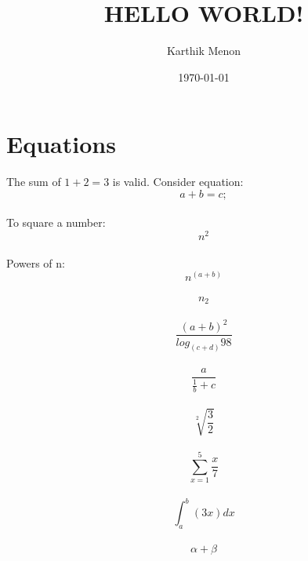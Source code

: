 \documentclass[a4paper,12pt]{article}
\begin{document}
\title{HELLO WORLD!}
\author{Karthik Menon}
\date{\today}
\maketitle
\newpage
\section{Equations}
		The sum of $1+2=3$ is valid.
		Consider equation: 
		\begin{equation}
			a+b=c;
		\end{equation}\\
		To square a number:
		\begin{equation}
			n^2
		\end{equation}\\
		Powers of n: 
		\begin{equation}
			n^{(a+b)}
		\end{equation}\\
		\begin{equation}
			n_{2}
		\end{equation}\\
		\begin{equation}
			 \frac{{(a+b)}^2}{log_{(c+d)}98} 
		\end{equation}\\
		\begin{equation}
			\frac{a}{\frac{1}{b}+c}
		\end{equation}\\
		\begin{equation}
			\sqrt[2]{\frac{3}{2}}
		\end{equation}\\
		\begin{equation}
			\sum_{x=1}^{5} \frac{x}{7}
		\end{equation}\\
		\begin{equation}
			\int_a^b (3x)dx 
		\end{equation}\\
		\begin{equation}
			\alpha + \beta
		\end{equation}
\end{document}
